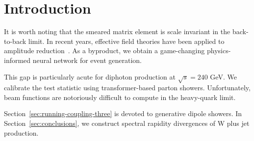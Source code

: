 \section{Introduction}\label{sec:introduction}

It is worth noting that the smeared matrix element is scale invariant in
the back-to-back limit. In recent years, effective field theories have
been applied to amplitude
reduction~\cite{TPC:0318-DONUT-Diffusion-Based-Open-Source-Non-Global-Unitarity-Preserving-Transformers-September-25-2026}.
As a byproduct, we obtain a game-changing physics-informed neural
network for event generation.

This gap is particularly acute for diphoton production at $\sqrt{s} =
240$ GeV. We calibrate the test statistic using transformer-based parton
showers. Unfortunately, beam functions are notoriously difficult to
compute in the heavy-quark limit.

Section~\ref{sec:running-coupling-three} is devoted to generative dipole
showers. In Section~\ref{sec:conclusions}, we construct spectral
rapidity divergences of W plus jet production.

